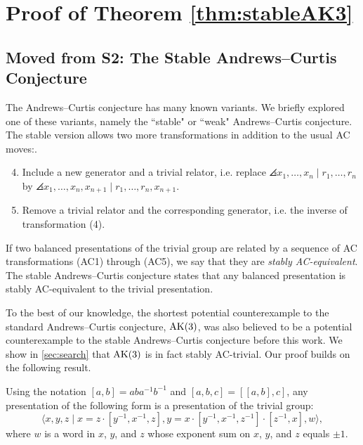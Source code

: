 
\section{Proof of Theorem \ref{thm:stableAK3}}
\label{sec:stable_ak3}

\subsection*{Moved from S2: The Stable Andrews--Curtis Conjecture}\label{sec:stable_ac}

The Andrews--Curtis conjecture has many known variants.
 We briefly explored one of these variants, namely the ``stable" or ``weak" Andrews--Curtis conjecture.
The stable version allows two more transformations in addition to the usual AC moves:.

\begin{enumerate}[label=(AC\arabic*)]
	\setcounter{enumi}{3}
	\item Include a new generator and a trivial relator, i.e. replace $\angles{x_1, \dots, x_n \mid r_1, \dots, r_n}$ by $\angles{x_1, \dots, x_n, x_{n+1} \mid r_1, \dots, r_n, x_{n+1}}$.
	\item Remove a trivial relator and the corresponding generator, i.e. the inverse of transformation (4).
\end{enumerate}
If two balanced presentations of the trivial group are related by a sequence of AC transformations (AC1) through (AC5), we say that they are \textit{stably AC-equivalent}.
The stable Andrews--Curtis conjecture states that any balanced presentation is stably AC-equivalent to the trivial presentation.

To the best of our knowledge, the shortest potential counterexample to the standard Andrews--Curtis conjecture, $\text{AK}(3)$, was also believed to be a potential counterexample to the stable Andrews--Curtis conjecture before this work.
We show in \autoref{sec:search} that $\text{AK}(3)$ is in fact stably AC-trivial.
Our proof builds on the following result.

\begin{theorem*}\label{theorem:MMS}
	Using the notation $[a, b] = a b a^{-1} b^{-1}$ and $[a, b, c] = [[a, b], c]$, any presentation of the following form is a presentation of the trivial group:
	\[
	\langle x, y, z \mid x = z \cdot [y^{-1}, x^{-1}, z], y = x \cdot [y^{-1}, x^{-1}, z^{-1}] \cdot [z^{-1}, x], w \rangle,
	\]
	where $w$ is a word in $x$, $y$, and $z$ whose exponent sum on $x$, $y$, and $z$ equals $\pm 1$.
\end{theorem*}

